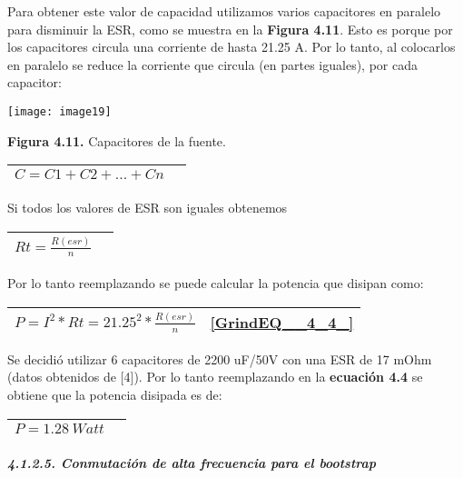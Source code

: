 \documentclass{article} %
\begin{document}
\noindent Para obtener este valor de capacidad utilizamos varios capacitores en paralelo para disminuir la ESR, como se muestra en la \textbf{Figura 4.11}. Esto es porque por los capacitores circula una corriente de hasta 21.25 A. Por lo tanto, al colocarlos en paralelo se reduce la corriente que circula (en partes iguales), por cada capacitor:

\noindent 

\noindent \texttt{[image: image19]}

\noindent \textbf{Figura 4.11.} Capacitores de la fuente.

\noindent 

\begin{tabular}{|p{3.9in}|p{0.5in}|} \hline 
$C=C1+C2+...+Cn$ &  \\ \hline 
\end{tabular}



\noindent Si todos los valores de ESR son iguales obtenemos

\noindent 

\begin{tabular}{|p{3.9in}|p{0.5in}|} \hline 
$Rt=\frac{R(esr)}{n}$ &  \\ \hline 
\end{tabular}



\noindent Por lo tanto reemplazando se puede calcular la potencia que disipan como:

\noindent 

\begin{tabular}{|p{3.9in}|p{0.4in}|} \hline 
$P=I^2*Rt={21.25}^2*\frac{R(esr)}{n}$ &    \eqref{GrindEQ__4_4_}  \\ \hline 
\end{tabular}



\noindent Se decidi\'{o} utilizar 6 capacitores  de 2200 uF/50V con una ESR de 17 mOhm (datos obtenidos de [4]). Por lo tanto reemplazando en la \textbf{ecuaci\'{o}n 4.4} se obtiene que la potencia disipada es de: 

\noindent 

\begin{tabular}{|p{3.9in}|p{0.4in}|} \hline 
$P=1.28\ Watt$ &  \\ \hline 
\end{tabular}


\subparagraph{4.1.2.5. Conmutaci\'{o}n de alta frecuencia para el bootstrap }
\end{document}
